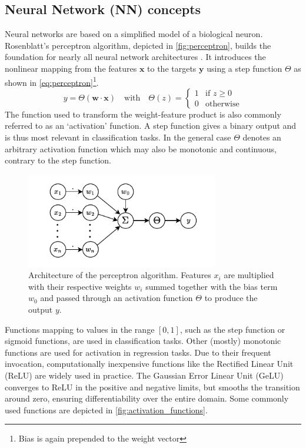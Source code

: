 \subsection{Neural Network (NN) concepts}
\label{subsec:nn_concepts}
Neural networks are based on a simplified model of a biological neuron. Rosenblatt's perceptron algorithm, depicted in \autoref{fig:perceptron}, builds the foundation for nearly all neural network architectures \parencite{ref:rosenblatt1958perceptron}. It introduces the nonlinear mapping from the features $\mathbf{x}$ to the targets $\mathbf{y}$ using a step function $\Theta$ as shown in \autoref{eq:perceptron}\footnote{Bias is again prepended to the weight vector}.
\begin{equation}
    \label{eq:perceptron}
    y = \Theta(\mathbf{w} \cdot \mathbf{x}) \quad \text{with} \quad
    \Theta(z) =
    \begin{cases}
        1 & \text{if } z \geq 0 \\
        0 & \text{otherwise}
    \end{cases}
\end{equation}
The function used to transform the weight-feature product is also commonly referred to as an `activation' function. A step function gives a binary output and is thus most relevant in classification tasks. In the general case $\Theta$ denotes an arbitrary activation function which may also be monotonic and continuous, contrary to the step function.\\
\begin{figure}[H]
    \centering
    \includegraphics[width=0.75\textwidth]{../fig/background/Perceptron.pdf}
    \caption[Perceptron]{Architecture of the perceptron algorithm. Features $x_i$ are multiplied with their respective weights $w_i$ summed together with the bias term $w_0$ and passed through an activation function $\Theta$ to produce the output $y$.}
    \label{fig:perceptron}
\end{figure}
Functions mapping to values in the range $[0, 1]$, such as the step function or sigmoid functions, are used in classification tasks. Other (mostly) monotonic functions are used for activation in regression tasks. Due to their frequent invocation, computationally inexpensive functions like the Rectified Linear Unit (ReLU) are widely used in practice. The Gaussian Error Linear Unit (GeLU) converges to ReLU in the positive and negative limits, but smooths the transition around zero, ensuring differentiability over the entire domain. Some commonly used functions are depicted in \autoref{fig:activation_functions}. 
